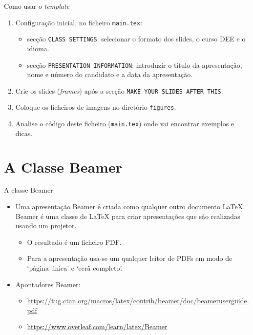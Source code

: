 \documentclass[
aspectratio=169,	%
LETI,				%
english,			%
]{DEEclassP}
\begin{document}
\begin{frame}[fragile]{Como usar o \textit{template}}

\setlstep{0.3cm}{0cm}{0cm}
\begin{enumerate}
	\item Configuração inicial, no ficheiro \verb|main.tex|: 
	\begin{itemize}
		\item secção \verb|CLASS SETTINGS|: selecionar o formato dos slides, o curso DEE e o idioma.
		\item secção \verb|PRESENTATION INFORMATION|: introduzir o título da apresentação, nome e número do candidato e a data da apresentação.
	\end{itemize}	
	\item Crie os slides (\textit{frames}) após a secção \verb|MAKE YOUR SLIDES AFTER THIS|.
	\item Coloque os ficheiros de imagens no diretório \verb|figures|.
	\item Analise o código deste ficheiro (\verb|main.tex|) onde vai encontrar exemplos e dicas.
\end{enumerate}

\end{frame}

\section{A Classe Beamer}

\begin{frame}{A classe Beamer}

\setlstep{0.5cm}{0cm}{0cm}
\begin{itemize}
	\item Uma apresentação Beamer é criada como qualquer outro documento \LaTeX{}. Beamer é uma classe de \LaTeX{} para criar apresentações que são realizadas usando um projetor.
	\begin{itemize}
		\item O resultado é um ficheiro PDF.
		\item Para a apresentação usa-se um qualquer leitor de PDFs em modo de `página única' e `ecrã completo'.
	\end{itemize}	
	\item Apontadores Beamer:
	\begin{itemize}
		\item \url{https://tug.ctan.org/macros/latex/contrib/beamer/doc/beameruserguide.pdf}
		\item \url{https://www.overleaf.com/learn/latex/Beamer}
	\end{itemize}
\end{itemize}
\end{frame}
\end{document}
